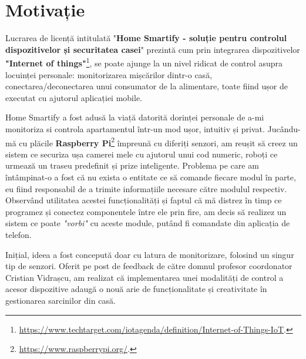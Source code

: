 \chapter*{Motivație} 

Lucrarea de licență intitulată "\textbf{Home Smartify - soluție pentru controlul dispozitivelor și securitatea casei}" prezintă cum prin integrarea dispozitivelor \textbf{"Internet of things"}\footnote{\url{https://www.techtarget.com/iotagenda/definition/Internet-of-Things-IoT}.}, se poate ajunge la un nivel ridicat de control asupra locuinței personale: monitorizarea mișcărilor dintr-o casă, conectarea/deconectarea unui consumator de la alimentare, toate fiind ușor de executat cu ajutorul aplicației mobile.

Home Smartify a fost adusă la viață datorită dorinței personale de a-mi monitoriza si controla apartamentul într-un mod ușor, intuitiv și privat. Jucându-mă cu plăcile \textbf{Raspberry Pi}\footnote{\url{https://www.raspberrypi.org/}.} împreună cu diferiți senzori, am reușit să creez un sistem ce securiza ușa camerei mele cu ajutorul unui cod numeric, roboți ce urmează un traseu predefinit și prize inteligente. Problema pe care am întâmpinat-o a fost că nu exista o entitate ce să comande fiecare modul în parte, eu fiind responsabil de a trimite informațiile necesare către modulul respectiv. Observând utilitatea acestei funcționalități și faptul că mă distrez în timp ce programez și conectez componentele între ele prin fire, am decis să realizez un sistem ce poate \emph{"vorbi"} cu aceste module, putând fi comandate din aplicația de telefon.

Inițial, ideea a fost concepută doar cu latura de monitorizare, folosind un singur tip de senzori. Oferit pe post de feedback de către domnul profesor coordonator Cristian Vidrașcu, am realizat că implementarea unei modalități de control a acesor dispozitive adaugă o nouă arie de funcționalitate și creativitate în gestionarea sarcinilor din casă.
